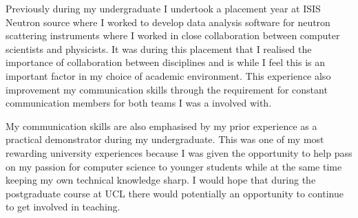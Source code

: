 \documentclass[paper=a4, fontsize=11pt]{scrartcl}	%
\numberwithin{equation}{section}															%
\numberwithin{figure}{section}																%
\numberwithin{table}{section}
\begin{document}
Previously during my undergraduate I undertook a placement year at ISIS Neutron source where I worked to develop data analysis software for neutron scattering instruments where I worked in close collaboration between computer scientists and physicists. It was during this placement that I realised the importance of collaboration between disciplines and is while I feel this is an important factor in my choice of academic environment. This experience also improvement my communication skills through the requirement for constant communication members for both teams I was a involved with.

My communication skills are also emphasised by my prior experience as a practical demonstrator during my undergraduate. This was one of my most rewarding university experiences because I was given the opportunity to help pass on my passion for computer science to younger students while at the same time keeping my own technical knowledge sharp. I would hope that during the postgraduate course at UCL there would potentially an opportunity to continue to get involved in teaching.



 

%
%
%
%
\end{document}
